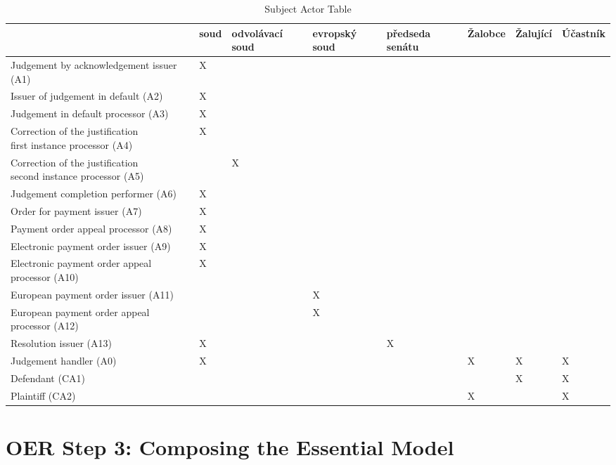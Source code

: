 \begin{landscape}
\begin{table}[h]
\caption{Subject Actor Table}
\label{tab:subjectactortable}
\begin{tabular}{|l|l|l|l|l|l|l|l|}
\hline
	 & soud  &  odvolávací soud & evropský soud & předseda senátu & Žalobce & Žalující & Účastník  \\ \hline
Judgement by acknowledgement issuer (A1) & X &  &  & & & & \\ \hline
Issuer of judgement in default (A2) & X &  & & & & & \\ \hline
Judgement in default processor (A3) & X & & & & & &\\ \hline
\thead{Correction of the justification\\ first instance processor (A4)} & X  &  & & & & &\\ \hline
\thead{Correction of the justification\\ second instance processor (A5)} &  & X & &  & & &\\ \hline
Judgement completion performer (A6) & X  & & & & & & \\ \hline
Order for payment issuer (A7) & X  & & & & &  &\\ \hline
Payment order appeal processor (A8) & X & & & & &  &\\ \hline
Electronic payment order issuer (A9) & X & & & & &  &\\ \hline
Electronic payment order appeal processor (A10) & X & & & & &  &\\ \hline
European payment order issuer  (A11) &  & &  X & & &  &\\ \hline
European payment order appeal processor (A12) &  & & X & & & & \\ \hline
Resolution issuer (A13) & X &  & & X & & &\\ \hline
Judgement handler (A0) & X &  & &  & X & X & X\\ \hline
Defendant (CA1) &  &  & & & & X & X\\ \hline
Plaintiff (CA2) &  &  & & & X &  & X\\ \hline
\end{tabular}
\end{table}


\end{landscape}

\section{OER Step 3: Composing the Essential Model}

